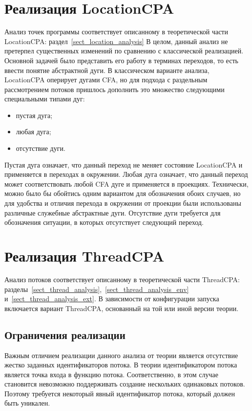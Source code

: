 
\section{Реализация LocationCPA}
\label{sect_impl_location}
Анализ точек программы соответствует описанному в теоретической части LocationCPA: раздел~\ref{sect_location_analysis}
В целом, данный анализ не претерпел существенных изменений по сравнению с классической реализацией. 
Основной задачей было представить его работу в терминах переходов, то есть ввести понятие абстрактной дуги.
В классическом варианте анализа, LocationCPA оперирует дугами CFA, но для подхода с раздельным рассмотрением потоков пришлось дополнить это множество следующими специальными типами дуг:
\begin{itemize}
\item пустая дуга;
\item любая дуга;
\item отсутствие дуги.
\end{itemize}

Пустая дуга означает, что данный переход не меняет состояние LocationCPA и применяется в переходах в окружении.
Любая дуга означает, что данный переход может соответствовать любой CFA дуге и применяется в проекциях.
Технически, можно было бы обойтись одним вариантом для обозначения обоих случаев, но для удобства и отличия перехода в окружении от проекции были использованы различные служебные абстрактные дуги.
Отсутствие дуги требуется для обозначения ситуации, в которых отсутствует следующий переход.

\section{Реализация ThreadCPA}
\label{sect_impl_thread}
Анализ потоков соответствует описанному в теоретической части ThreadCPA: разделы~\ref{sect_thread_analysis},~\ref{sect_thread_analysis_env} и~\ref{sect_thread_analysis_ext}.
В зависимости от конфигурации запуска включается вариант ThreadCPA, основанный на той или иной версии теории.

\subsection{Ограничения реализации}

Важным отличием реализации данного анализа от теории является отсутствие жестко заданных идентификаторов потока. 
В теории идентификатором потока является точка входа в функцию потока. 
Соответственно, в этом случае становится невозможно поддерживать создание нескольких одинаковых потоков. 
Поэтому требуется некоторый явный идентификатор потока, который должен быть уникален.

